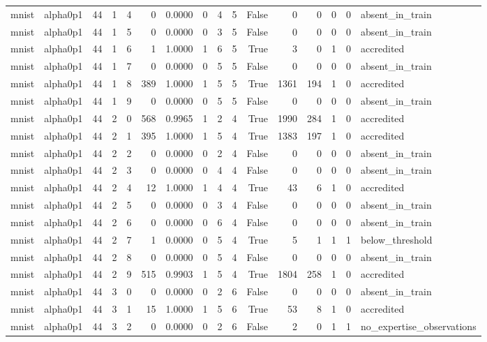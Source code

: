 \begin{tabular}{llrrrrrrrrrrrrrl}
mnist & alpha0p1 & 44 & 1 & 4 & 0 & 0.0000 & 0 & 4 & 5 & False & 0 & 0 & 0 & 0 & absent\_in\_train \\
mnist & alpha0p1 & 44 & 1 & 5 & 0 & 0.0000 & 0 & 3 & 5 & False & 0 & 0 & 0 & 0 & absent\_in\_train \\
mnist & alpha0p1 & 44 & 1 & 6 & 1 & 1.0000 & 1 & 6 & 5 & True & 3 & 0 & 1 & 0 & accredited \\
mnist & alpha0p1 & 44 & 1 & 7 & 0 & 0.0000 & 0 & 5 & 5 & False & 0 & 0 & 0 & 0 & absent\_in\_train \\
mnist & alpha0p1 & 44 & 1 & 8 & 389 & 1.0000 & 1 & 5 & 5 & True & 1361 & 194 & 1 & 0 & accredited \\
mnist & alpha0p1 & 44 & 1 & 9 & 0 & 0.0000 & 0 & 5 & 5 & False & 0 & 0 & 0 & 0 & absent\_in\_train \\
mnist & alpha0p1 & 44 & 2 & 0 & 568 & 0.9965 & 1 & 2 & 4 & True & 1990 & 284 & 1 & 0 & accredited \\
mnist & alpha0p1 & 44 & 2 & 1 & 395 & 1.0000 & 1 & 5 & 4 & True & 1383 & 197 & 1 & 0 & accredited \\
mnist & alpha0p1 & 44 & 2 & 2 & 0 & 0.0000 & 0 & 2 & 4 & False & 0 & 0 & 0 & 0 & absent\_in\_train \\
mnist & alpha0p1 & 44 & 2 & 3 & 0 & 0.0000 & 0 & 4 & 4 & False & 0 & 0 & 0 & 0 & absent\_in\_train \\
mnist & alpha0p1 & 44 & 2 & 4 & 12 & 1.0000 & 1 & 4 & 4 & True & 43 & 6 & 1 & 0 & accredited \\
mnist & alpha0p1 & 44 & 2 & 5 & 0 & 0.0000 & 0 & 3 & 4 & False & 0 & 0 & 0 & 0 & absent\_in\_train \\
mnist & alpha0p1 & 44 & 2 & 6 & 0 & 0.0000 & 0 & 6 & 4 & False & 0 & 0 & 0 & 0 & absent\_in\_train \\
mnist & alpha0p1 & 44 & 2 & 7 & 1 & 0.0000 & 0 & 5 & 4 & True & 5 & 1 & 1 & 1 & below\_threshold \\
mnist & alpha0p1 & 44 & 2 & 8 & 0 & 0.0000 & 0 & 5 & 4 & False & 0 & 0 & 0 & 0 & absent\_in\_train \\
mnist & alpha0p1 & 44 & 2 & 9 & 515 & 0.9903 & 1 & 5 & 4 & True & 1804 & 258 & 1 & 0 & accredited \\
mnist & alpha0p1 & 44 & 3 & 0 & 0 & 0.0000 & 0 & 2 & 6 & False & 0 & 0 & 0 & 0 & absent\_in\_train \\
mnist & alpha0p1 & 44 & 3 & 1 & 15 & 1.0000 & 1 & 5 & 6 & True & 53 & 8 & 1 & 0 & accredited \\
mnist & alpha0p1 & 44 & 3 & 2 & 0 & 0.0000 & 0 & 2 & 6 & False & 2 & 0 & 1 & 1 & no\_expertise\_observations \\

\end{tabular}
